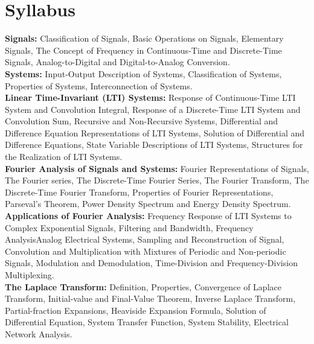 \documentclass[a5paper,10pt]{report}
\begin{document}
    \chapter*{Syllabus}
    \thispagestyle{empty}
    \vspace*{-3.1cm}
    \textbf{Signals: }Classification of Signals, Basic Operations on Signals, Elementary Signals, The Concept of Frequency in Continuous-Time and Discrete-Time Signals, Analog-to-Digital and Digital-to-Analog Conversion. \\ [5pt]
    \textbf{Systems: }Input-Output Description of Systems, Classification of Systems, Properties of Systems, Interconnection of Systems. \\ [5pt]
    \textbf{Linear Time-Invariant (LTI) Systems: }Response of Continuous-Time LTI System and Convolution Integral, Response of a Discrete-Time LTI System and Convolution Sum, Recursive and Non-Recursive Systems, Differential and Difference Equation Representations of LTI Systems, Solution of Differential and Difference Equations, State Variable Descriptions of LTI Systems, Structures for the Realization of LTI Systems. \\ [5pt]
    \textbf{Fourier Analysis of Signals and Systems: }Fourier Representations of Signals, The Fourier series, The Discrete-Time Fourier Series, The Fourier Transform, The Discrete-Time Fourier Transform, Properties of Fourier Representations, Parseval’s Theorem, Power Density Spectrum and Energy Density Spectrum. \\ [5pt]
    \textbf{Applications of Fourier Analysis: }Frequency Response of LTI Systems to Complex Exponential Signals, Filtering and Bandwidth, Frequency AnalysisAnalog Electrical Systems, Sampling and Reconstruction of Signal, Convolution and Multiplication with Mixtures of Periodic and Non-periodic Signals, Modulation and Demodulation, Time-Division and Frequency-Division Multiplexing. \\ [5pt]
    \textbf{The Laplace Transform: }Definition, Properties, Convergence of Laplace Transform, Initial-value and Final-Value Theorem, Inverse Laplace Transform, Partial-fraction Expansions, Heaviside Expansion Formula, Solution of Differential Equation, System Transfer Function, System Stability, Electrical Network Analysis.
\newpage
\end{document}
